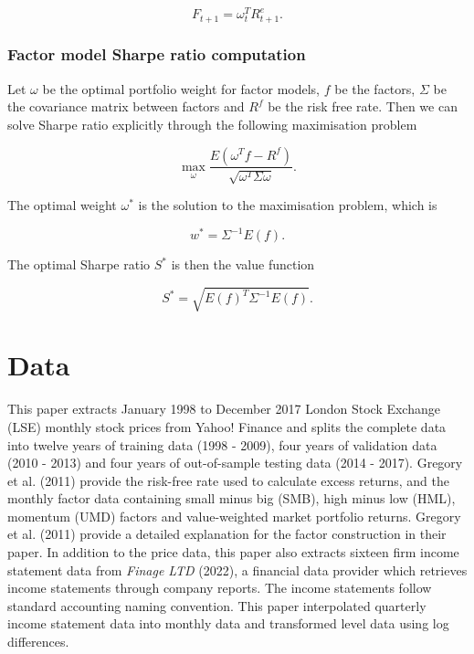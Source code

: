 \documentclass[12pt]{article}
\begin{document}
\[
F_{t+1} = \omega_t^TR^e_{t+1}.
\]

\hypertarget{factor-model-sharpe-ratio-computation}{%
\subsubsection{Factor model Sharpe ratio computation}\label{factor-model-sharpe-ratio-computation}}

Let \(\omega\) be the optimal portfolio weight for factor
models, \(f\) be the factors, \(\Sigma\) be the covariance
matrix between factors and \(R^f\) be the risk free rate.
Then we can solve Sharpe ratio explicitly through the
following maximisation problem

\[
\max_{\omega} \frac{E(\omega^Tf-R^f)}{\sqrt{\omega^T\Sigma\omega}}.
\]

The optimal weight \(\omega^*\) is the solution to the
maximisation problem, which is

\[
w^* = \Sigma^{-1}E(f).
\]

The optimal Sharpe ratio \(S^*\) is then the value function

\[
S^* = \sqrt{E(f)^T\Sigma^{-1}E(f)}.
\]

\hypertarget{data}{%
\section{Data}\label{data}}

\thispagestyle{plain}

This paper extracts January 1998 to December 2017 London
Stock Exchange (LSE) monthly stock prices from Yahoo! Finance and
splits the complete data into twelve years of
training data (1998 - 2009), four years of validation data (2010 - 2013) and
four years of out-of-sample testing data (2014 - 2017).
Gregory et al. (2011) provide the risk-free rate used
to calculate excess returns, and
the monthly factor data containing small minus big
(SMB), high minus low (HML), momentum (UMD) factors and
value-weighted market portfolio returns.
Gregory et al. (2011) provide a detailed explanation for
the factor construction in their paper.
In addition to the price data, this paper also extracts sixteen
firm income statement data from \emph{Finage {LTD}} (2022),
a financial data
provider which retrieves income
statements through company reports. The income statements
follow standard accounting naming convention.
This paper interpolated quarterly income statement data into
monthly data and transformed level data using log
differences.
\end{document}
